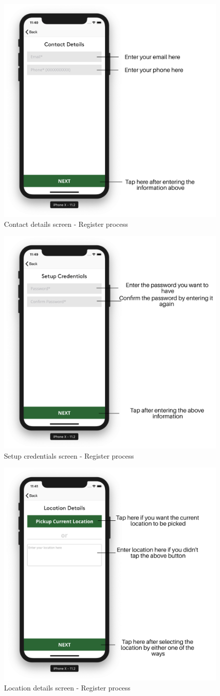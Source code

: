 \begin{itemize}
        
        \begin{figure}[H]
            \centering
            \includegraphics[width=0.50\linewidth]{figures/ch2/register_contact.png}
            \caption{\label{fig:register_contact} Contact details screen - Register process}
        \end{figure}
     
        \begin{figure}[H]
            \centering
            \includegraphics[width=0.50\linewidth]{figures/ch2/credentials_setup.png}
            \caption{\label{fig:credentials_setup} Setup credentials screen - Register process}
        \end{figure}
       
        
        \begin{figure}[H]
            \centering
            \includegraphics[width=0.50\linewidth]{figures/ch2/register_location.png}
            \caption{\label{fig:register_location} Location details screen - Register process}
        \end{figure}
 

\end{itemize}
